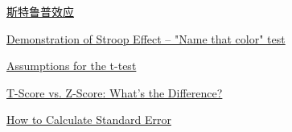 \documentclass[11pt]{article}
\begin{document}
\href{https://zh.wikipedia.org/wiki/\%E6\%96\%AF\%E7\%89\%B9\%E9\%B2\%81\%E6\%99\%AE\%E6\%95\%88\%E5\%BA\%94}{斯特鲁普效应}

\href{http://www.math.unt.edu/~tam/SelfTests/StroopEffects.html}{Demonstration
of Stroop Effect -- "Name that color" test}

\href{http://www.csic.cornell.edu/Elrod/t-test/t-test-assumptions.html}{Assumptions
for the t-test}

\href{http://www.statisticshowto.com/probability-and-statistics/hypothesis-testing/t-score-vs-z-score/}{T-Score
vs. Z-Score: What's the Difference?}

\href{https://ncalculators.com/math-worksheets/calculate-standard-error.htm}{How
to Calculate Standard Error}


    
    
    
    
\end{document}
